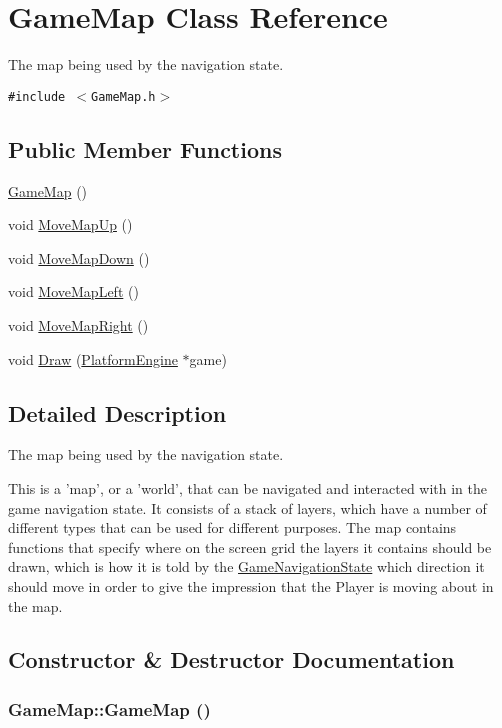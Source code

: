 \hypertarget{class_game_map}{
\section{GameMap Class Reference}
\label{d4/de2/class_game_map}
}
The map being used by the navigation state.  


{\tt \#include $<$GameMap.h$>$}

\subsection*{Public Member Functions}
\begin{CompactItemize}
\item 
\hyperlink{class_game_map_ae71e5694cf19612fcaa4c1e21b03b71}{GameMap} ()
\item 
void \hyperlink{class_game_map_e9b33ef01ca643a2389e7be0ebf838b1}{MoveMapUp} ()
\item 
void \hyperlink{class_game_map_7466202e8f2bd3ae188ddcbd7e50a023}{MoveMapDown} ()
\item 
void \hyperlink{class_game_map_90fe97ecdcee40995d8e5fa86857cf5c}{MoveMapLeft} ()
\item 
void \hyperlink{class_game_map_e76fd062e8e47331e7e999dbea0f0486}{MoveMapRight} ()
\item 
void \hyperlink{class_game_map_c289ffedd32b98d2827e6b765b3e50d6}{Draw} (\hyperlink{class_platform_engine}{PlatformEngine} $\ast$game)
\end{CompactItemize}


\subsection{Detailed Description}
The map being used by the navigation state. 

This is a 'map', or a 'world', that can be navigated and interacted with in the game navigation state. It consists of a stack of layers, which have a number of different types that can be used for different purposes. The map contains functions that specify where on the screen grid the layers it contains should be drawn, which is how it is told by the \hyperlink{class_game_navigation_state}{GameNavigationState} which direction it should move in order to give the impression that the Player is moving about in the map. 

\subsection{Constructor \& Destructor Documentation}
\hypertarget{class_game_map_ae71e5694cf19612fcaa4c1e21b03b71}{
\subsubsection[{GameMap}]{\setlength{\rightskip}{0pt plus 5cm}GameMap::GameMap ()}}
\label{d4/de2/class_game_map_ae71e5694cf19612fcaa4c1e21b03b71}




